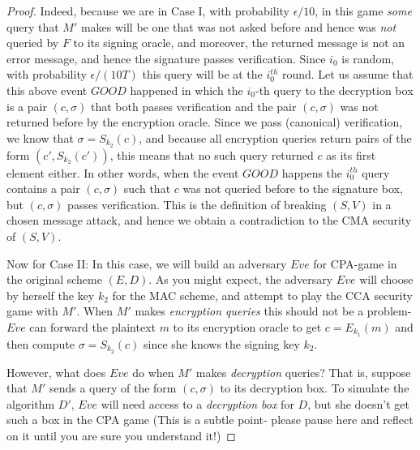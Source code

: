 \begin{proof}
Indeed, because we are in Case I, with probability \(\epsilon/10\), in
this game \emph{some} query that \(M'\) makes will be one that was not
asked before and hence was \emph{not} queried by \(F\) to its signing
oracle, and moreover, the returned message is not an error message, and
hence the signature passes verification. Since \(i_0\) is random, with
probability \(\epsilon/(10T)\) this query will be at the \(i_0^{th}\)
round. Let us assume that this above event
\(\ensuremath{\mathit{GOOD}}\) happened in which the \(i_0\)-th query to
the decryption box is a pair \((c,\sigma)\) that both passes
verification and the pair \((c,\sigma)\) was not returned before by the
encryption oracle. Since we pass (canonical) verification, we know that
\(\sigma=S_{k_2}(c)\), and because all encryption queries return pairs
of the form \((c',S_{k_2}(c'))\), this means that no such query returned
\(c\) as its first element either. In other words, when the event
\(\ensuremath{\mathit{GOOD}}\) happens the \(i_0^{th}\) query contains a
pair \((c,\sigma)\) such that \(c\) was not queried before to the
signature box, but \((c,\sigma)\) passes verification. This is the
definition of breaking \((S,V)\) in a chosen message attack, and hence
we obtain a contradiction to the CMA security of \((S,V)\).

Now for Case II: In this case, we will build an adversary \(Eve\) for
CPA-game in the original scheme \((E,D)\). As you might expect, the
adversary \(Eve\) will choose by herself the key \(k_2\) for the MAC
scheme, and attempt to play the CCA security game with \(M'\). When
\(M'\) makes \emph{encryption queries} this should not be a problem-
\(Eve\) can forward the plaintext \(m\) to its encryption oracle to get
\(c=E_{k_1}(m)\) and then compute \(\sigma = S_{k_2}(c)\) since she
knows the signing key \(k_2\).

However, what does \(Eve\) do when \(M'\) makes \emph{decryption}
queries? That is, suppose that \(M'\) sends a query of the form
\((c,\sigma)\) to its decryption box. To simulate the algorithm \(D'\),
\(Eve\) will need access to a \emph{decryption box} for \(D\), but she
doesn't get such a box in the CPA game (This is a subtle point- please
pause here and reflect on it until you are sure you understand it!)


\end{proof}
